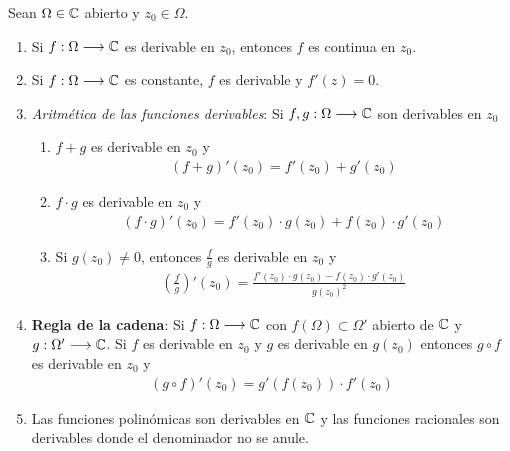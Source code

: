 \begin{obs}
    Sean $\Omega \in \mathbb{C}$ abierto y $z_0 \in \Omega$.
    \begin{enumerate}
        \item Si $f : \Omega \longrightarrow \mathbb{C}$ es derivable en $z_0$, entonces $f$ es continua en $z_0$.
        \item Si $f: \Omega \longrightarrow \mathbb{C}$ es constante, $f$ es derivable y $f'(z) = 0$.
        \item \textit{Aritmética de las funciones derivables}: Si $f,g: \Omega \longrightarrow \mathbb{C}$ son derivables en $z_0$
              \begin{enumerate}
                  \item $f + g$ es derivable en $z_0$ y
                        \begin{align*}
                            (f + g)'(z_0) = f'(z_0) + g'(z_0)
                        \end{align*}
                  \item $f \cdot g$ es derivable en $z_0$ y
                        \begin{align*}
                            (f \cdot g)'(z_0) = f'(z_0)\cdot g(z_0) + f(z_0) \cdot g'(z_0)
                        \end{align*}
                  \item Si $g(z_0) \not = 0$, entonces $\frac{f}{g}$ es derivable en $z_0$ y
                        \begin{align*}
                            \left(\frac{f}{g}\right)'(z_0) = \frac{f'(z_0)\cdot g(z_0) - f(z_0) \cdot g'(z_0)}{g(z_0)^2}
                        \end{align*}
              \end{enumerate}
        \item \textbf{Regla de la cadena}: Si $f : \Omega \longrightarrow \mathbb{C}$ con $f(\Omega) \subset \Omega'$ abierto de $\mathbb{C}$ y $g : \Omega' \longrightarrow \mathbb{C}$. Si $f$ es derivable en $z_0$ y $g$ es derivable en $g(z_0)$ entonces $g \circ f$ es derivable en $z_0$ y
              \begin{align*}
                  (g \circ f)'(z_0) = g'(f(z_0)) \cdot f'(z_0)
              \end{align*}
        \item Las funciones polinómicas son derivables en $\mathbb{C}$ y las funciones racionales son derivables donde el denominador no se anule.
    \end{enumerate}
\end{obs}

